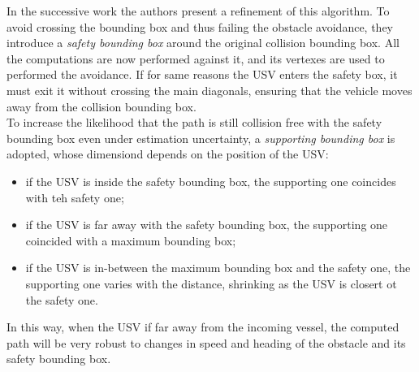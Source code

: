 \documentclass[journal]{IEEEtran}
\begin{document}
              \indent In the successive work \cite{Simetti2014} the authors present a refinement of this algorithm. To avoid crossing the bounding box and thus failing the obstacle avoidance, they introduce a \textit{safety bounding box} around the original collision bounding box. All the computations are now performed against it, and its vertexes are used to performed the avoidance. If for same reasons the USV enters the safety box, it must exit it without crossing the main diagonals, ensuring that the vehicle moves away from the collision bounding box.\\
              To increase the likelihood that the path is still collision free with the safety bounding box even under estimation uncertainty, a \textit{supporting bounding box} is adopted, whose dimensiond depends on the position of the USV:
                    \begin{itemize}
                          \item if the USV is inside the safety bounding box, the supporting one coincides with teh safety one;
                          \item if the USV is far away with the safety bounding box, the supporting one coincided with a maximum bounding box;
                          \item if the USV is in-between the maximum bounding box and the safety one, the supporting one varies with the distance, shrinking as the USV is closert ot the safety one.
                    \end{itemize}
              In this way, when the USV if far away from the incoming vessel, the computed path will be very robust to changes in speed and heading of the obstacle and its safety bounding box.\\
\end{document}
